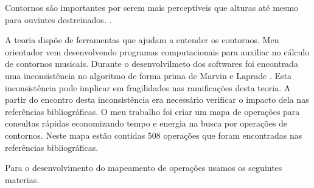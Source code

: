 \documentclass[11pt]{article}
\begin{document}
Contornos são importantes por serem mais perceptíveis que alturas
até mesmo para ouvintes destreinados.
\cite[p. 225]{Marvin1987}.

A teoria dispõe de ferramentas que ajudam a entender os contornos.
Meu orientador vem desenvolvendo programas computacionais para
auxiliar no cálculo de contornos musicais.
Durante o desenvolvilmeto dos softwares foi encontrada uma
inconsistência no algoritmo de forma prima de Marvin e Laprade
\cite{Marvin1987}. Esta inconsistência pode implicar em fragilidades
nas ramificações desta teoria.
A partir do encontro desta inconsistência era necessário verificar o
impacto dela nas referências bibliográficas.
O meu trabalho foi criar um mapa de operações para consultas rápidas
economizando tempo e energia na busca por operações de
contornos. Neste mapa estão contidas 508 operações que foram
encontradas nas referências bibliográficas.

\label{sec:materiais}

Para o desenvolvimento do mapeamento de operações usamos os seguintes
materias.

\end{document}
